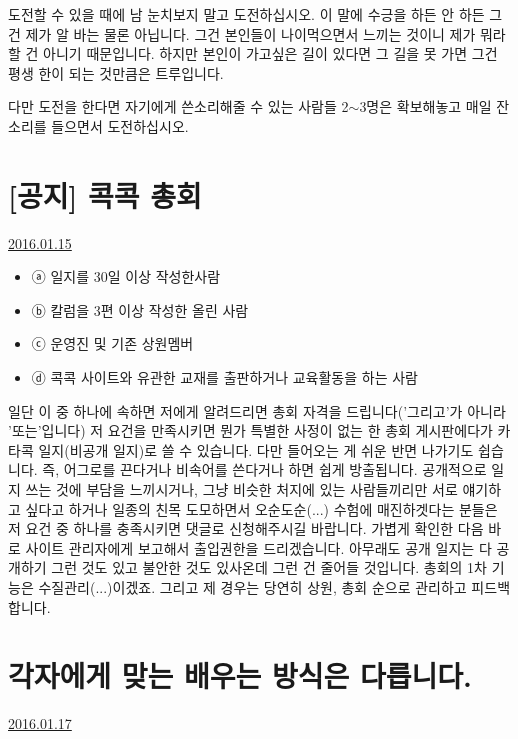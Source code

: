 도전할 수 있을 때에 남 눈치보지 말고 도전하십시오.
이 말에 수긍을 하든 안 하든 그건 제가 알 바는 물론 아닙니다.
그건 본인들이 나이먹으면서 느끼는 것이니 제가 뭐라할 건 아니기 때문입니다.
하지만 본인이 가고싶은 길이 있다면 그 길을 못 가면 그건 평생 한이 되는 것만큼은 트루입니다.
\vspace{5mm}

다만 도전을 한다면 자기에게 쓴소리해줄 수 있는 사람들 2$\sim$3명은 확보해놓고 매일 잔소리를 들으면서 도전하십시오.
\vspace{5mm}






\section{[공지] 콕콕 총회}
\href{https://www.kockoc.com/Apoc/589984}{2016.01.15}

\vspace{5mm}

\begin{itemize}
    \item[] ⓐ 일지를 30일 이상 작성한사람
    \item[] ⓑ 칼럼을 3편 이상 작성한 올린 사람
    \item[] ⓒ 운영진 및 기존 상원멤버
    \item[] ⓓ 콕콕 사이트와 유관한 교재를 출판하거나 교육활동을 하는 사람
\end{itemize}
\vspace{5mm}

일단 이 중 하나에 속하면 저에게 알려드리면 총회 자격을 드립니다('그리고'가 아니라 '또는'입니다)
저 요건을 만족시키면 뭔가 특별한 사정이 없는 한 총회 게시판에다가 카타콕 일지(비공개 일지)로 쓸 수 있습니다.
다만 들어오는 게 쉬운 반면 나가기도 쉽습니다. 즉, 어그로를 끈다거나 비속어를 쓴다거나 하면 쉽게 방출됩니다.
공개적으로 일지 쓰는 것에 부담을 느끼시거나, 그냥 비슷한 처지에 있는 사람들끼리만 서로 얘기하고 싶다고 하거나
일종의 친목 도모하면서 오순도순(...) 수험에 매진하겟다는 분들은 저 요건 중 하나를 충족시키면 댓글로 신청해주시길 바랍니다.
가볍게 확인한 다음 바로 사이트 관리자에게 보고해서 출입권한을 드리겠습니다.
아무래도 공개 일지는 다 공개하기 그런 것도 있고 불안한 것도 있사온데 그런 건 줄어들 것입니다.
총회의 1차 기능은 수질관리(...)이겠죠. 그리고 제 경우는 당연히 상원, 총회 순으로 관리하고 피드백합니다.
\vspace{5mm}




\section{각자에게 맞는 배우는 방식은 다릅니다.}
\href{https://www.kockoc.com/Apoc/592462}{2016.01.17}


